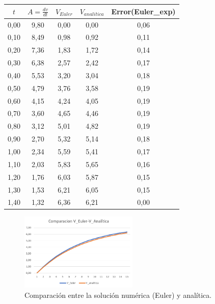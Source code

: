 \documentclass{article}
\begin{document}
\begin{table}[htbp]
    \centering
    \begin{tabular}{|c|c|c|c|c|}
    \hline
    \( t \) & \( A = \frac{dv}{dt} \) & \( V_{Euler} \) & \( V_{analitica} \) & Error(Euler\_exp) \\ \hline
    0,00 & 9,80 & 0,00 & 0,00 & 0,06 \\ \hline
    0,10 & 8,49 & 0,98 & 0,92 & 0,11 \\ \hline
    0,20 & 7,36 & 1,83 & 1,72 & 0,14 \\ \hline
    0,30 & 6,38 & 2,57 & 2,42 & 0,17 \\ \hline
    0,40 & 5,53 & 3,20 & 3,04 & 0,18 \\ \hline
    0,50 & 4,79 & 3,76 & 3,58 & 0,19 \\ \hline
    0,60 & 4,15 & 4,24 & 4,05 & 0,19 \\ \hline
    0,70 & 3,60 & 4,65 & 4,46 & 0,19 \\ \hline
    0,80 & 3,12 & 5,01 & 4,82 & 0,19 \\ \hline
    0,90 & 2,70 & 5,32 & 5,14 & 0,18 \\ \hline
    1,00 & 2,34 & 5,59 & 5,41 & 0,17 \\ \hline
    1,10 & 2,03 & 5,83 & 5,65 & 0,16 \\ \hline
    1,20 & 1,76 & 6,03 & 5,87 & 0,15 \\ \hline
    1,30 & 1,53 & 6,21 & 6,05 & 0,15 \\ \hline
    1,40 & 1,32 & 6,36 & 6,21 & 0,00 \\ \hline
    \end{tabular}
\end{table}

\begin{figure}[htbp]
    \centering
    \includegraphics[width=0.5\textwidth]{EulerAnalitica.png}
    \caption{Comparación entre la solución numérica (Euler) y analítica.}
\end{figure}
\end{document}
